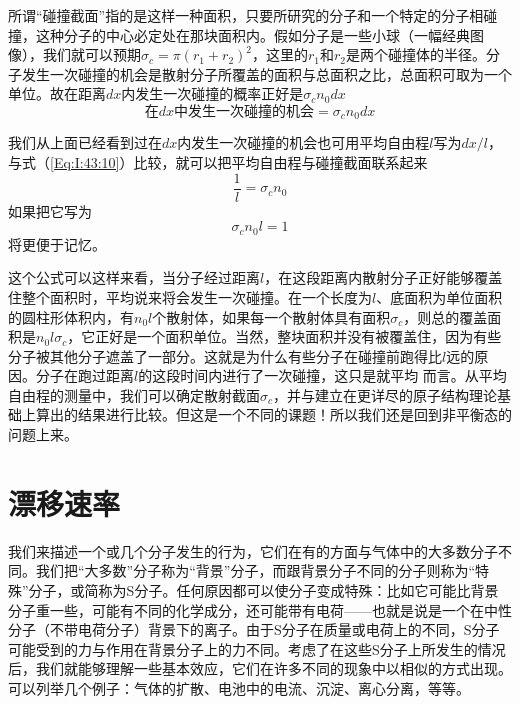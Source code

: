 所谓“碰撞截面”指的是这样一种面积，只要所研究的分子和一个特定的分子相碰撞，这种分子的中心必定处在那块面积内。假如分子是一些小球（一幅经典图像），我们就可以预期$\sigma_c =\pi(r_1 +r_2)^2$，这里的$r_1$和$r_2$是两个碰撞体的半径。分子发生一次碰撞的机会是散射分子所覆盖的面积与总面积之比，总面积可取为一个单位。故在距离$dx$内发生一次碰撞的概率正好是$\sigma_c n_0 dx$
\begin{equation}
    \label{Eq:I:43:10}
    \text{在$dx$中发生一次碰撞的机会}=\sigma_c n_0 dx
\end{equation}

我们从上面已经看到过在$dx$内发生一次碰撞的机会也可用平均自由程$l$写为$dx/l$，与式（\ref{Eq:I:43:10}）比较，就可以把平均自由程与碰撞截面联系起来
\begin{equation}
    \label{Eq:I:43:11}
    \frac{1}{l}=\sigma_c n_0
\end{equation}
如果把它写为
\begin{equation}
    \label{Eq:I:43:12}
    \sigma_c n_0 l = 1
\end{equation}
将更便于记忆。

这个公式可以这样来看，当分子经过距离$l$，在这段距离内散射分子正好能够覆盖住整个面积时，平均说来将会发生一次碰撞。在一个长度为$l$、底面积为单位面积的圆柱形体积内，有$n_0l$个散射体，如果每一个散射体具有面积$\sigma_c$，则总的覆盖面积是$n_0l\sigma_c$，它正好是一个面积单位。当然，整块面积并没有被覆盖住，因为有些分子被其他分子遮盖了一部分。这就是为什么有些分子在碰撞前跑得比$l$远的原因。分子在跑过距离$l$的这段时间内进行了一次碰撞，这只是就平均 而言。从平均自由程的测量中，我们可以确定散射截面$\sigma_c$，并与建立在更详尽的原子结构理论基础上算出的结果进行比较。但这是一个不同的课题！所以我们还是回到非平衡态的问题上来。

\section{漂移速率}

我们来描述一个或几个分子发生的行为，它们在有的方面与气体中的大多数分子不同。我们把“大多数”分子称为“背景”分子，而跟背景分子不同的分子则称为“特殊”分子，或简称为S分子。任何原因都可以使分子变成特殊：比如它可能比背景分子重一些，可能有不同的化学成分，还可能带有电荷——也就是说是一个在中性分子（不带电荷分子）背景下的离子。由于S分子在质量或电荷上的不同，S分子可能受到的力与作用在背景分子上的力不同。考虑了在这些S分子上所发生的情况后，我们就能够理解一些基本效应，它们在许多不同的现象中以相似的方式出现。可以列举几个例子：气体的扩散、电池中的电流、沉淀、离心分离，等等。


